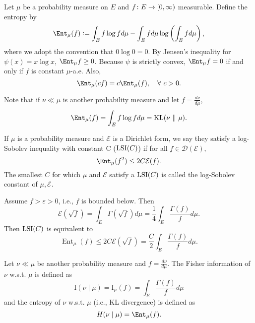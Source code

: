 Let $\mu$ be a probability measure on $E$ and $f \colon E \rightarrow [0,\infty)$ measurable. Define the entropy by
\begin{equation*}
    \Ent_\mu(f) \defeq \int_E f\log f d\mu - \int_E fd\mu \log \bc{\int_E f d\mu},
\end{equation*}
where we adopt the convention that $ 0 \log 0 =0$. By Jensen's inequality for $\psi(x) = x \log x$, $\Ent_\mu f \geq 0$. Because $\psi$ is strictly convex, $\Ent_\mu f = 0$ if and only if $f$ is constant $\mu$-a.e. Also,
\begin{equation*}
    \Ent_\mu(cf) = c\Ent_\mu(f),\quad \forall~c > 0.
\end{equation*}
\begin{rmk}
    Note that if $\nu \ll \mu$ is another probability measure and let $f = \frac{d \nu}{d \mu}$, 
    \begin{equation*}
        \Ent_\mu(f) = \int_E f\log f d\mu = \op{KL}(\nu ~\Vert~ \mu).
    \end{equation*}
\end{rmk}

\begin{defn}
    If $\mu$ is a probability measure and $\mathcal{E}$ is a Dirichlet form, we say they satisfy a log-Sobolev inequality with constant C ($\operatorname{LSI}(C)$) if for all $f \in \mathcal{D}(\mathcal{E})$,
    \begin{equation*}
        \Ent_\mu(f^2) \leq 2C \mathcal{E}(f).
    \end{equation*}
    The smallest $C$ for which $\mu$ and $\mathcal{E}$ satisfy a $\operatorname{LSI}(C)$ is called the log-Sobolev constant of $\mu,\mathcal{E}$.
\end{defn}

Assume $f > \varepsilon >0$, i.e., $f$ is bounded below. Then
\begin{equation*}
    \mathcal{E}(\sqrt{f}) = \int_E \Gamma(\sqrt{f})d\mu = \frac{1}{4}\int_E \frac{\Gamma(f)}{f} d\mu.
\end{equation*}
Then $\operatorname{LSI}(C)$ is equivalent to
\begin{equation*}
    \operatorname{Ent}_\mu(f) \leq 2 C \mathcal{E}(\sqrt{f})=\frac{C}{2} \int_E \frac{\Gamma(f)}{f} d \mu.
\end{equation*}

\begin{defn}
    Let $\nu \ll \mu$ be another probability measure and $f = \frac{d \nu}{d \mu}$. The Fisher information of $\nu$ w.s.t. $\mu$ is defined as
    \begin{equation*}
        \mathrm{I}(\nu \mid \mu)=\mathrm{I}_\mu(f)=\int_E \frac{\Gamma(f)}{f} d \mu
    \end{equation*}
    and the entropy of $\nu$ w.s.t. $\mu$ (i.e., KL divergence) is defined as
    \begin{equation*}
        H(\nu \mid \mu) = \Ent_\mu(f).
    \end{equation*}
\end{defn}

